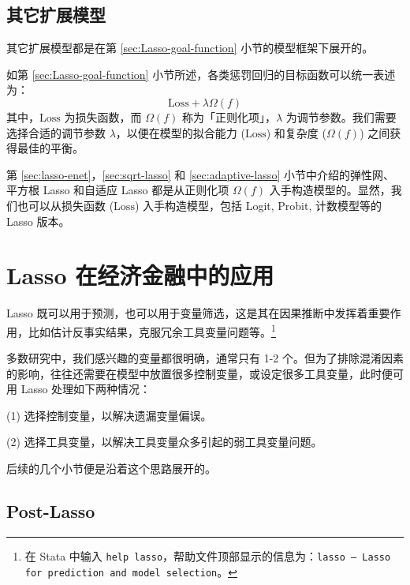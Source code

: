 
\subsection{其它扩展模型}

其它扩展模型都是在第 \ref{sec:Lasso-goal-function} 小节的模型框架下展开的。

如第 \ref{sec:Lasso-goal-function} 小节所述，各类惩罚回归的目标函数可以统一表述为：
\begin{equation}\label{eq:Lasso-08-a}
	\text{Loss}+\lambda \Omega(f)
\end{equation}
其中，$\text{Loss}$ 为损失函数，而 $\Omega(f)$ 称为「正则化项」，$\lambda$ 为调节参数。我们需要选择合适的调节参数 $\lambda$，以便在模型的拟合能力 ($\text{Loss}$) 和复杂度 ($\Omega(f)$) 之间获得最佳的平衡。

第 \ref{sec:lasso-enet}，\ref{sec:sqrt-lasso} 和  \ref{sec:adaptive-lasso} 小节中介绍的弹性网、平方根 Lasso 和自适应 Lasso 都是从正则化项 $\Omega(f)$ 入手构造模型的。显然，我们也可以从损失函数 ($\text{Loss}$) 入手构造模型，包括 Logit, Probit, 计数模型等的 Lasso 版本。 





\section{Lasso 在经济金融中的应用}\label{sec:lassoApp}
Lasso 既可以用于预测，也可以用于变量筛选，这是其在因果推断中发挥着重要作用，比如估计反事实结果，克服冗余工具变量问题等。\footnote{%
    在 Stata 中输入 \texttt{help lasso}，帮助文件顶部显示的信息为：\texttt{lasso -- Lasso for prediction and model selection}。}

多数研究中，我们感兴趣的变量都很明确，通常只有 1-2 个。但为了排除混淆因素的影响，往往还需要在模型中放置很多控制变量，或设定很多工具变量，此时便可用 Lasso 处理如下两种情况：

\vspace{5pt}
(1) 选择控制变量，以解决遗漏变量偏误。

(2) 选择工具变量，以解决工具变量众多引起的弱工具变量问题。

\vspace{5pt}

后续的几个小节便是沿着这个思路展开的。



\subsection{Post-Lasso}\label{sec:lasso-post-lasso}

